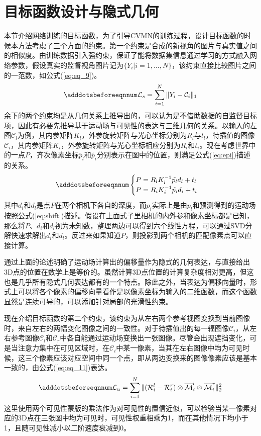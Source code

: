 \section{目标函数设计与隐式几何}
本节介绍网络训练的目标函数，为了引导CVMN的训练过程，设计目标函数的时候本方法考虑了三个方面的约束。第一个约束是合成的新视角的图片与真实值之间的相似度。由训练数据引入强约束，保证了能将数据集信息通过学习的方式融入网络参数，假设真实的监督视角图片记为$\{Y_i | i=1, \dots, N\}$，该约束直接比较图片之间的一范数，如公式(\ref{eq:eq_9})。
\begin{equation}\label{eq:eq_9}
    \adddotsbeforeeqnnum%
    \mathcal{L}_s = \sum_{i=1}^N \|Y_i - \mathcal{C}_i\|_1
\end{equation}
余下的两个约束均是从几何关系上推导出的，可以认为是不借助数据的自监督目标项，因此有必要先推导基于运动场与可见性的表达与三维几何的关系。以输入的左图$\mathcal{C}_l$为例，其内参矩阵$K_l$，外参旋转矩阵与光心坐标分别为$R_l$与$t_l$，待插值的图像$\mathcal{C}_i$，其内参矩阵$K_i$，外参旋转矩阵与光心坐标相应分别为$R_i$和$t_i$。现在考虑世界中的一点$P$，齐次像素坐标$\tilde{p_l}$和$\tilde{p_i}$分别表示在图中的位置，则满足公式(\ref{eq:epi})描述的关系。
\begin{equation} \label{eq:epi}
    \adddotsbeforeeqnnum%
    \begin{cases}
        P = R_l K_l^{-1}\tilde{p_l}d_l + t_l\\
        P = R_i K_i^{-1}\tilde{p_i}d_i + t_i
    \end{cases}
\end{equation}
其中$d_i$和$d_l$是点$P$在两个相机下各自的深度，而$p_i$实际上是由$p_l$和预测得到的运动场按照公式(\ref{eq:shift})描述。假设在上面式子里相机的内外参和像素坐标都是已知，那么将$P$、$d_i$和$d_l$视为未知数，整理两边可以得到六个线性方程，可以通过SVD分解快速求解出$d_i$和$d_l$。反过来如果知道$P$，则投影到两个相机的匹配像素点可以直接计算。

通过上面的论述明确了运动场计算出的偏移量作为隐式的几何表达，与直接给出3D点的位置在数学上是等价的。虽然计算3D点位置的计算复杂度相对更高，但这也是几乎所有隐式几何表达都有的一个特点。除此之外，当表达为偏移向量时，形式上可以将各个像素的偏移向量看作是以像素坐标为输入的二维函数，而这个函数显然是连续可导的，可以添加针对局部的光滑性约束。

现在介绍目标函数的第二个约束，该约束为从左右两个参考视图变换到当前图像时，来自左右的两幅变化图像之间的一致性。对于待插值出的每一辐图像$\mathcal{C}_i$，从左右参考图像$\mathcal{C}_l$和$\mathcal{C}_r$中各自能通过运动场变换出一张图像。尽管会出现遮挡变化，可是当注意力集中在可见区域时，在$\mathcal{C}_i$中某一像素，当其在左右图像中均为可见时候，这三个像素应该对应空间中同一个点，即从两边变换来的图像像素应该是基本一致的，由公式(\ref{eq:eq_11})表达。
\begin{equation} \label{eq:eq_11}
    \adddotsbeforeeqnnum%
    \mathcal{L}_u = \sum_{i=1}^N \|(\mathcal{R}_i^l - \mathcal{R}_i^r) \otimes \overline{\mathcal{M}}_i^l \otimes \overline{\mathcal{M}}_i^r \|_2^2
\end{equation}
这里使用两个可见性蒙版的乘法作为对可见性的置信近似，可以检验当某一像素对应的3D点在三张图中均为可见时，可见性权重相乘为1，而在其他情况下均小于1，且随可见性减小以二阶速度衰减到0。

